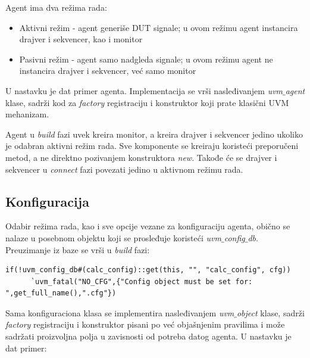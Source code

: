 Agent ima dva režima rada:

\begin{itemize}
\item Aktivni režim - agent generiše DUT signale; u ovom režimu agent instancira
  drajver i sekvencer, kao i monitor
\item Pasivni režim - agent samo nadgleda signale; u ovom režimu agent ne
  instancira drajver i sekvencer, već samo monitor
\end{itemize}

U nastavku je dat primer agenta. Implementacija se vrši nasleđivanjem
\emph{uvm\(\_\)agent} klase, sadrži kod za \emph{factory} registraciju i
konstruktor koji prate klasični UVM mehanizam.



Agent u \emph{build} fazi uvek kreira monitor, a kreira drajver i sekvencer
jedino ukoliko je odabran aktivni režim rada. Sve komponente se kreiraju
koristeći preporučeni metod, a ne direktno pozivanjem konstruktora \emph{new}.
Takođe će se drajver i sekvencer u \emph{connect} fazi povezati jedino u
aktivnom režimu rada.


\subsection{Konfiguracija}

Odabir režima rada, kao i sve opcije vezane za konfiguraciju agenta, obično se
nalaze u posebnom objektu koji se prosleđuje koristeći
\emph{uvm\(\_\)config\(\_\)db}. Preuzimanje iz baze se vrši u \emph{build} fazi:

\begin{lstlisting}
if(!uvm_config_db#(calc_config)::get(this, "", "calc_config", cfg))
      `uvm_fatal("NO_CFG",{"Config object must be set for: ",get_full_name(),".cfg"})
\end{lstlisting}

Sama konfiguraciona klasa se implementira nasleđivanjem \emph{uvm\(\_\)object}
klase, sadrži \emph{factory} registraciju i konstruktor pisani po već
objašnjenim pravilima i može sadržati proizvoljna polja u zavisnosti od potreba
datog agenta. U nastavku je dat primer:



